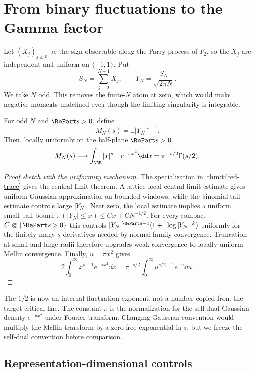 \section{From binary fluctuations to the Gamma factor}
\label{sec:gamma}

Let $(X_j)_{j\ge0}$ be the sign observable along the Parry process of $F_2$,
so the $X_j$ are independent and uniform on $\{-1,1\}$. Put
\[
 S_N=\sum_{j=0}^{N-1}X_j,
 \qquad Y_N=\frac{S_N}{\sqrt{2\pi N}}.
\]
We take $N$ odd. This removes the finite-$N$ atom at zero, which would make
negative moments undefined even though the limiting singularity is
integrable.

\begin{theorem}
\label{thm:gamma}
For odd $N$ and $\RePart s>0$, define
\[
 M_N(s)=\mathbb E|Y_N|^{s-1}.
\]
Then, locally uniformly on the half-plane $\RePart s>0$,
\[
 M_N(s)\longrightarrow
 \int_{\RR}|x|^{s-1}e^{-\pi x^2}\dd x
 =\pi^{-s/2}\Gamma(s/2).
\]
\end{theorem}

\begin{proof}[Proof sketch with the uniformity mechanism]
The specialization in \cref{thm:tilted-trace} gives the central limit
theorem. A lattice local
central limit estimate gives uniform Gaussian approximation on bounded
windows, while the binomial tail estimate controls large $|Y_N|$. Near zero,
the local estimate implies a uniform small-ball bound
$\mathbb P(|Y_N|\le x)\le Cx+C N^{-1/2}$. For every compact
$C\Subset\{\RePart s>0\}$ this controls
$|Y_N|^{\RePart s-1}(1+|\log|Y_N||^k)$ uniformly for the finitely many
$s$-derivatives needed by normal-family convergence. Truncation at small and
large radii therefore upgrades weak convergence to locally uniform Mellin
convergence. Finally, $u=\pi x^2$ gives
\[
 2\int_0^\infty x^{s-1}e^{-\pi x^2}\dd x
 =\pi^{-s/2}\int_0^\infty u^{s/2-1}e^{-u}\dd u.
\]
\end{proof}

The $1/2$ is now an internal fluctuation exponent, not a number copied from
the target critical line. The constant $\pi$ is the normalization for the
self-dual Gaussian density $e^{-\pi x^2}$ under Fourier transform. Changing
Gaussian convention would multiply the Mellin transform by a zero-free
exponential in $s$, but we freeze the self-dual convention before comparison.

\subsection{Representation-dimensional controls}


